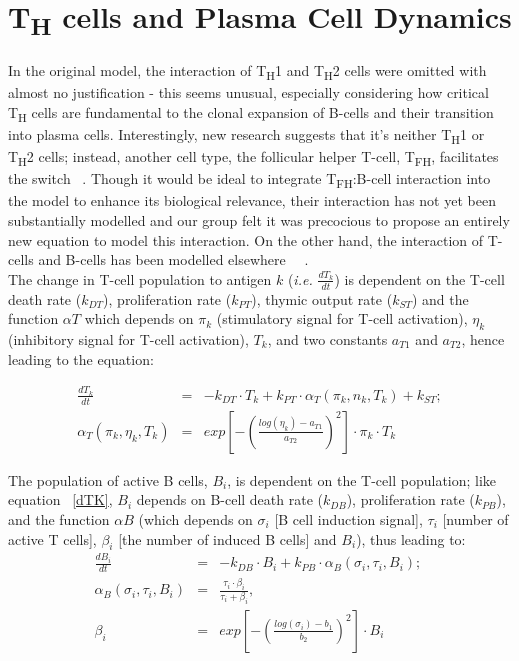 \documentclass[a4paper, 12pt]{report}
\begin{document}
\section{ T\textsubscript{H} cells and Plasma Cell Dynamics} %
In the original model, the interaction of T\textsubscript{H}1 and T\textsubscript{H}2 cells were omitted with almost no justification - this seems unusual, especially considering how critical T\textsubscript{H} cells are fundamental to the clonal expansion of B-cells and their transition into plasma cells. Interestingly, new research suggests that it's neither T\textsubscript{H}1 or T\textsubscript{H}2 cells; instead, another cell type, the follicular helper T-cell, T\textsubscript{FH}, facilitates the switch ~\cite{Swain}. Though it would be ideal to integrate T\textsubscript{FH}:B-cell interaction into the model to enhance its biological relevance, their interaction has not yet been substantially modelled and our group felt it was precocious to propose an entirely new equation to model this interaction. On the other hand, the interaction of T-cells and B-cells has been modelled elsewhere ~\cite{Carneiro1}~\cite{Carneiro2}.\\ 

The change in T-cell population to antigen $k$ (\emph{i.e.} $\frac{dT_k}{dt}$) is dependent on the T-cell death rate ($k_{DT}$), proliferation rate ($k_{PT}$), thymic output rate ($k_{ST}$) and the function $\alpha{T}$ which depends on $\pi_{k}$ (stimulatory signal for T-cell activation), $\eta_{k}$ (inhibitory signal for T-cell activation), $T_{k}$, and two constants $a_{T1}$ and $a_{T2}$, hence leading to the equation:

\begin{eqnarray}
\frac{dT_k}{dt} &=& -k_{DT} \cdot T_k + k_{PT} \cdot \alpha_{T}(\pi_{k}, n_{k}, T_{k}) + k_{ST}; \label{dTK} \\
\alpha_{T}(\pi_{k}, \eta_{k}, T_{k}) &=& exp\left[-\left(\frac{log(\eta_{k}) - a_{T1}}{a_{T2}}\right)^{2}\right] \cdot \pi_{k} \cdot T_{k}
\end{eqnarray}

The population of active B cells, $B_{i}$, is dependent on the T-cell population; like equation ~\ref{dTK}, $B_{i}$ depends on B-cell death rate ($k_{DB}$), proliferation rate ($k_{PB}$), and the function $\alpha{B}$ (which depends on $\sigma_{i}$ [B cell induction signal], $\tau_{i}$ [number of active T cells], $\beta_{i}$ [the number of induced B cells] and $B_{i}$), thus leading to:
\begin{eqnarray}
\frac{dB_i}{dt} &=& -k_{DB} \cdot B_i + k_{PB} \cdot \alpha_{B}(\sigma_{i}, \tau_{i}, B_{i}); ~\label{dBI} \\
\alpha_{B}(\sigma_{i}, \tau_{i}, B_{i}) &=& \frac{\tau_{i}\cdot{\beta_{i}}}{\tau_{i} + \beta_{i}}, \\
\beta_{i} &=&  exp\left[-\left(\frac{log(\sigma_{i}) - b_{1}}{b_{2}}\right)^{2}\right] \cdot B_{i}
\end{eqnarray}
\end{document}
